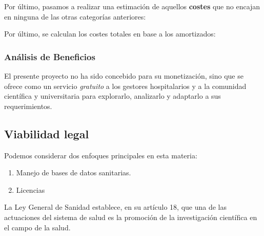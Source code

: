 Por último, pasamos a realizar una estimación de aquellos \textbf{costes} que no encajan en ninguna de las otras categorías anteriores:



Por último, se calculan los costes totales en base a los amortizados:


\subsubsection{Análisis de Beneficios}

El presente proyecto no ha sido concebido para su monetización, sino que se ofrece como un servicio \textit{gratuito} a los gestores hospitalarios y a la comunidad científica y universitaria para explorarlo, analizarlo y adaptarlo a sus requerimientos.

\newpage

\subsection{Viabilidad legal}

Podemos considerar dos enfoques principales en esta materia:
\begin{enumerate}
    \item Manejo de bases de datos sanitarias.
    \item Licencias
\end{enumerate}

La Ley General de Sanidad establece, en su artículo 18, que una de las actuaciones del sistema de salud es la promoción de la investigación científica en el campo de la salud\cite{GarridoElustondo2012InvestigacionPrimaria}.

